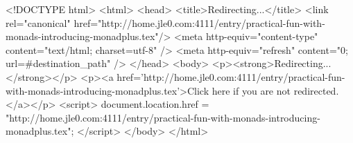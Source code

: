 <!DOCTYPE html>
<html>
<head>
<title>Redirecting...</title>
<link rel="canonical" href="http://home.jle0.com:4111/entry/practical-fun-with-monads-introducing-monadplus.tex"/>
<meta http-equiv="content-type" content="text/html; charset=utf-8" />
<meta http-equiv="refresh" content="0; url=#{destination_path}" />
</head>
<body>
  <p><strong>Redirecting...</strong></p>
  <p><a href='http://home.jle0.com:4111/entry/practical-fun-with-monads-introducing-monadplus.tex'>Click here if you are not redirected.</a></p>
  <script>
    document.location.href = "http://home.jle0.com:4111/entry/practical-fun-with-monads-introducing-monadplus.tex";
  </script>
</body>
</html>
